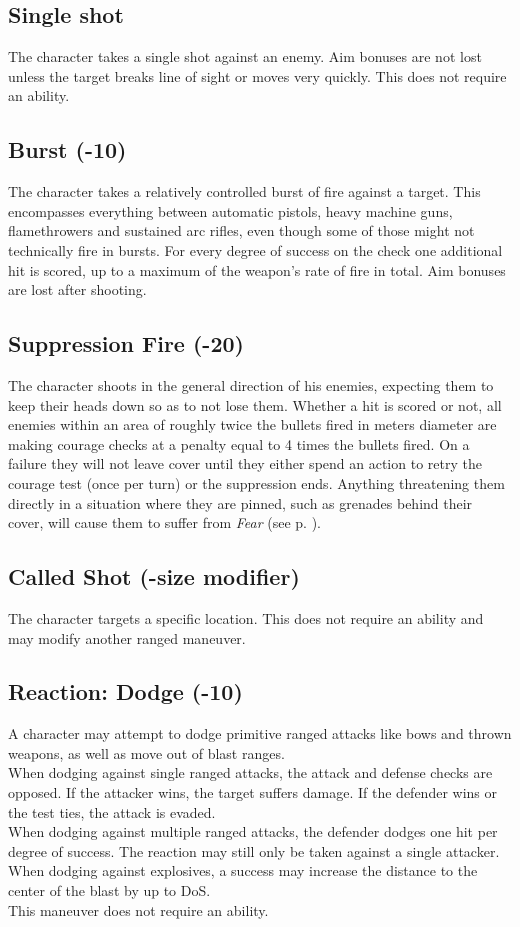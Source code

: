 \subsection*{Single shot}
The character takes a single shot against an enemy. Aim bonuses are not lost unless the target breaks line of sight or moves very quickly. This does not require an ability.
\subsection*{Burst (-10)}
The character takes a relatively controlled burst of fire against a target. This encompasses everything between automatic pistols, heavy machine guns, flamethrowers and sustained arc rifles, even though some of those might not technically fire in bursts. For every degree of success on the check one additional hit is scored, up to a maximum of the weapon’s rate of fire in total. Aim bonuses are lost after shooting.
\subsection*{Suppression Fire (-20)}
The character shoots in the general direction of his enemies, expecting them to keep their heads down so as to not lose them. Whether a hit is scored or not, all enemies within an area of roughly twice the bullets fired in meters diameter are making courage checks at a penalty equal to 4 times the bullets fired. On a failure they will not leave cover until they either spend an action to retry the courage test (once per turn) or the suppression ends. Anything threatening them directly in a situation where they are pinned, such as grenades behind their cover, will cause them to suffer from \emph{Fear} (see p. \pageref{feartable}).
\subsection*{Called Shot (-size modifier)}
The character targets a specific location. This does not require an ability and may modify another ranged maneuver.
\subsection*{Reaction: Dodge (-10)}
A character may attempt to dodge primitive ranged attacks like bows and thrown weapons, as well as move out of blast ranges.\\
When dodging against single ranged attacks, the attack and defense checks are opposed. If the attacker wins, the target suffers damage. If the defender wins or the test ties, the attack is evaded.\\
When dodging against multiple ranged attacks, the defender dodges one hit per degree of success. The reaction may still only be taken against a single attacker.\\
When dodging against explosives, a success may increase the distance to the center of the blast by up to DoS.\\
This maneuver does not require an ability.
